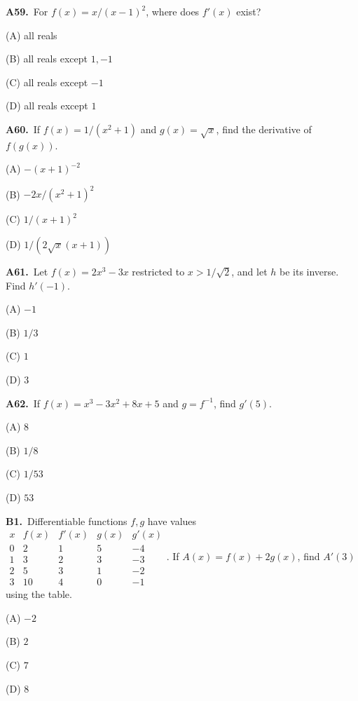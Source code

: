 \documentclass[11pt]{article}
\begin{document}
\bigskip\noindent\textbf{A59.}\ For $f(x)=x/(x-1)^2$, where does $f'(x)$ exist?
\begin{list}{}{\setlength{\leftmargin}{3em}\setlength{\labelwidth}{2.5em}\setlength{\itemsep}{0pt}\setlength{\topsep}{2pt}}
\item[(A)] all reals
\item[(B)] all reals except $1,-1$
\item[(C)] all reals except $-1$
\item[(D)] all reals except $1$
\end{list}

\bigskip\noindent\textbf{A60.}\ If $f(x)=1/(x^2+1)$ and $g(x)=\sqrt{x}$, find the derivative of $f(g(x))$.
\begin{list}{}{\setlength{\leftmargin}{3em}\setlength{\labelwidth}{2.5em}\setlength{\itemsep}{0pt}\setlength{\topsep}{2pt}}
\item[(A)] $-(x+1)^{-2}$
\item[(B)] $-2x/(x^2+1)^2$
\item[(C)] $1/(x+1)^2$
\item[(D)] $1/(2\sqrt{x}(x+1))$
\end{list}

\bigskip\noindent\textbf{A61.}\ Let $f(x)=2x^3-3x$ restricted to $x>1/\sqrt2$, and let $h$ be its inverse. Find $h\prime(-1)$.
\begin{list}{}{\setlength{\leftmargin}{3em}\setlength{\labelwidth}{2.5em}\setlength{\itemsep}{0pt}\setlength{\topsep}{2pt}}
\item[(A)] $-1$
\item[(B)] $1/3$
\item[(C)] $1$
\item[(D)] $3$
\end{list}

\bigskip\noindent\textbf{A62.}\ If $f(x)=x^3-3x^2+8x+5$ and $g=f^{-1}$, find $g'(5)$.
\begin{list}{}{\setlength{\leftmargin}{3em}\setlength{\labelwidth}{2.5em}\setlength{\itemsep}{0pt}\setlength{\topsep}{2pt}}
\item[(A)] $8$
\item[(B)] $1/8$
\item[(C)] $1/53$
\item[(D)] $53$
\end{list}

\bigskip\noindent\textbf{B1.}\ Differentiable functions $f,g$ have values $\begin{array}{c|rrrr}x&f(x)&f\prime(x)&g(x)&g\prime(x)\\0&2&1&5&-4\\1&3&2&3&-3\\2&5&3&1&-2\\3&10&4&0&-1\end{array}$. If $A(x)=f(x)+2g(x)$, find $A'(3)$ using the table.
\begin{list}{}{\setlength{\leftmargin}{3em}\setlength{\labelwidth}{2.5em}\setlength{\itemsep}{0pt}\setlength{\topsep}{2pt}}
\item[(A)] $-2$
\item[(B)] $2$
\item[(C)] $7$
\item[(D)] $8$
\end{list}
\end{document}
